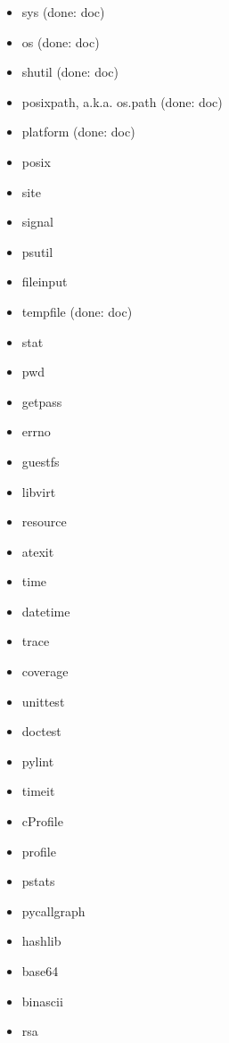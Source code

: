 \documentclass{article}
\begin{document}
\begin{enumerate}
\begin{itemize}
            \item sys (done: doc)
            \item os (done: doc)
            \item shutil (done: doc)
            \item posixpath, a.k.a. os.path (done: doc)
            \item platform (done: doc)
            \item posix
            \item site
            \item signal
            \item psutil
            \item fileinput
            \item tempfile (done: doc)
            \item stat
            \item pwd
            \item getpass
            \item errno
            \item guestfs
            \item libvirt
            \item resource
            \item atexit

            \item time
            \item datetime

            \item trace
            \item coverage
            \item unittest
            \item doctest

            \item pylint

            \item timeit
            \item cProfile
            \item profile
            \item pstats
            \item pycallgraph

            \item hashlib
            \item base64
            \item binascii
            \item rsa


\end{itemize}
\end{enumerate}
\end{document}
